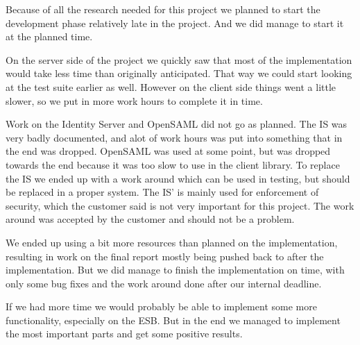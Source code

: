 
Because of all the research needed for this project we planned to start the development phase relatively late in the project. And we did manage to start it at the planned time.

On the server side of the project we quickly saw that most of the implementation would take less time than originally anticipated. That way we could start looking at the test suite earlier as well. However on the client side things went a little slower, so we put in more work hours to complete it in time. 

Work on the Identity Server and OpenSAML did not go as planned. The IS was very badly documented, and alot of work hours was put into something that in the end was dropped. OpenSAML was used at some point, but was dropped towards the end because it was too slow to use in the client library. To replace the IS we ended up with a work around which can be used in testing, but should be replaced in a proper system. The IS' is mainly used for enforcement of security, which the customer said is not very important for this project. The work around was accepted by the customer and should not be a problem.

We ended up using a bit more resources than planned on the implementation, resulting in work on the final report mostly being pushed back to after the implementation. But we did manage to finish the implementation on time, with only some bug fixes and the work around done after our internal deadline.

If we had more time we would probably be able to implement some more functionality, especially on the ESB. But in the end we managed to implement the most important parts and get some positive results.